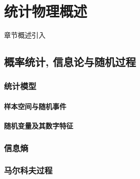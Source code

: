 \chapter{统计物理概述}\label{14}

章节概述引入

\section{概率统计, 信息论与随机过程}\label{14-1}

\subsection{统计模型}\label{14-1-1}

\subsubsection{样本空间与随机事件}\label{14-1-1-1}

\subsubsection{随机变量及其数字特征}\label{14-1-1-2}

\subsection{信息熵}\label{14-1-2}

\subsection{马尔科夫过程}\label{14-1-3}